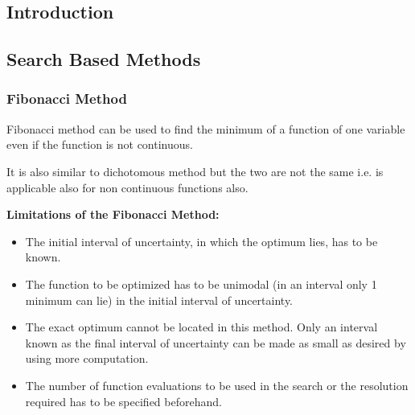 \documentclass[12pt, letterpaper]{article}
\begin{document}
\subsection{Introduction}

\subsection{Search Based Methods}
\subsubsection{Fibonacci Method}
Fibonacci method can be used to find the minimum of a function of one variable even if the function is not continuous.

It is also similar to dichotomous method but the two are not the same i.e. is applicable also for  non continuous functions also.

\begin{center}
    \textbf{Limitations of the Fibonacci Method: }
\end{center}
\begin{itemize}
    \item The initial interval of uncertainty, in which the optimum lies, has to be known.
    \item The function to be optimized has to be unimodal (in an interval only 1 minimum can lie) in the initial interval of uncertainty.
    \item The exact optimum cannot be located in this method. Only an interval known as the final interval of uncertainty can be made as small as desired by using more computation.
    \item The number of function evaluations to be used in the search or the resolution required has to be specified beforehand.
\end{itemize}
\end{document}
